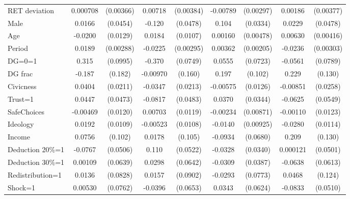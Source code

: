 \begin{tabular}{l|cccccc|cc}
RET deviation   & 0.000708         &(0.00366)&  0.00718\sym{*}  &(0.00384)& -0.00789\sym{***}&(0.00297)&  0.00186         &(0.00377)\\
Male            &   0.0166         & (0.0454)&   -0.120\sym{**} & (0.0478)&    0.104\sym{***}& (0.0334)&   0.0229         & (0.0478)\\
Age             &  -0.0200         & (0.0129)&   0.0184\sym{*}  & (0.0107)&  0.00160         &(0.00478)&  0.00630         &(0.00416)\\
Period          &   0.0189\sym{***}&(0.00288)&  -0.0225\sym{***}&(0.00295)&  0.00362\sym{*}  &(0.00205)&  -0.0236\sym{***}&(0.00303)\\
DG=0=1          &    0.315\sym{***}& (0.0995)&   -0.370\sym{***}& (0.0749)&   0.0555         & (0.0723)&  -0.0561         & (0.0789)\\
DG frac         &   -0.187         &  (0.182)& -0.00970         &  (0.160)&    0.197\sym{*}  &  (0.102)&    0.229\sym{*}  &  (0.130)\\
Civicness       &   0.0404\sym{*}  & (0.0211)&  -0.0347         & (0.0213)& -0.00575         & (0.0126)& -0.00851         & (0.0258)\\
Trust=1         &   0.0447         & (0.0473)&  -0.0817\sym{*}  & (0.0483)&   0.0370         & (0.0344)&  -0.0625         & (0.0549)\\
SafeChoices     & -0.00469         & (0.0120)&  0.00703         & (0.0119)& -0.00234         &(0.00871)& -0.00110         & (0.0123)\\
Ideology        &   0.0192\sym{*}  & (0.0109)& -0.00523         & (0.0108)&  -0.0140         &(0.00925)&  -0.0280\sym{**} & (0.0114)\\
Income          &   0.0756         &  (0.102)&   0.0178         &  (0.105)&  -0.0934         & (0.0680)&    0.209         &  (0.130)\\
Deduction 20\%=1&  -0.0767         & (0.0506)&    0.110\sym{**} & (0.0522)&  -0.0328         & (0.0340)& 0.000121         & (0.0501)\\
Deduction 30\%=1&  0.00109         & (0.0639)&   0.0298         & (0.0642)&  -0.0309         & (0.0387)&  -0.0638         & (0.0613)\\
Redistribution=1&   0.0136         & (0.0828)&   0.0157         & (0.0902)&  -0.0293         & (0.0773)&   0.0468         &  (0.124)\\
Shock=1         &  0.00530         & (0.0762)&  -0.0396         & (0.0653)&   0.0343         & (0.0624)&  -0.0833         & (0.0510)\\

\end{tabular}
